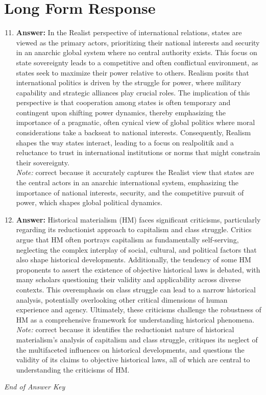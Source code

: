 \documentclass[12pt]{article}
\begin{document}
\section*{Long Form Response}
\begin{enumerate}[label=\arabic*.]
\setcounter{enumi}{10}
\item \textbf{Answer:} In the Realist perspective of international relations, states are viewed as the primary actors, prioritizing their national interests and security in an anarchic global system where no central authority exists. This focus on state sovereignty leads to a competitive and often conflictual environment, as states seek to maximize their power relative to others. Realism posits that international politics is driven by the struggle for power, where military capability and strategic alliances play crucial roles. The implication of this perspective is that cooperation among states is often temporary and contingent upon shifting power dynamics, thereby emphasizing the importance of a pragmatic, often cynical view of global politics where moral considerations take a backseat to national interests. Consequently, Realism shapes the way states interact, leading to a focus on realpolitik and a reluctance to trust in international institutions or norms that might constrain their sovereignty.
\\ \textit{Note:} correct because it accurately captures the Realist view that states are the central actors in an anarchic international system, emphasizing the importance of national interests, security, and the competitive pursuit of power, which shapes global political dynamics.
\item \textbf{Answer:} Historical materialism (HM) faces significant criticisms, particularly regarding its reductionist approach to capitalism and class struggle. Critics argue that HM often portrays capitalism as fundamentally self-serving, neglecting the complex interplay of social, cultural, and political factors that also shape historical developments. Additionally, the tendency of some HM proponents to assert the existence of objective historical laws is debated, with many scholars questioning their validity and applicability across diverse contexts. This overemphasis on class struggle can lead to a narrow historical analysis, potentially overlooking other critical dimensions of human experience and agency. Ultimately, these criticisms challenge the robustness of HM as a comprehensive framework for understanding historical phenomena.
\\ \textit{Note:} correct because it identifies the reductionist nature of historical materialism's analysis of capitalism and class struggle, critiques its neglect of the multifaceted influences on historical developments, and questions the validity of its claims to objective historical laws, all of which are central to understanding the criticisms of HM.
\end{enumerate}

\vfill
\noindent\textit{End of Answer Key}
\end{document}
